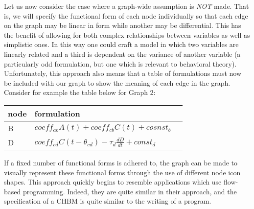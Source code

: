 \documentclass[runningheads,a4paper]{llncs}
\begin{document}
Let us now consider the case where a graph-wide assumption is \emph{NOT} made.
That is, we will specify the functional form of each node individually so that each edge on the graph may be linear in form while another may be differential.
This has the benefit of allowing for both complex relationships between variables as well as simplistic ones.
In this way one could craft a model in which two variables are linearly related and a third is dependent on the variance of another variable (a particularly odd formulation, but one which is relevant to behavioral theory).
Unfortunately, this approach also means that a table of formulations must now be included with our graph to show the meaning of each edge in the graph.
Consider for example the table below for Graph 2:
%
\begin{center}
  \centering
  \begin{tabular}{ | l | l | l |}
      \hline
      node & formulation \\ \hline
      B & $coeff_{ab}A(t) + coeff_{cb}C(t) + cosnst_b$  \\ \hline
      D & $coeff_{cd}C(t-\theta_{cd}) - \tau_{d}\frac{dD}{dt} + const_d$ \\ \hline
  \end{tabular}
\end{center}
%
If a fixed number of functional forms is adhered to, the graph can be made to visually represent these functional forms through the use of different node icon shapes. 
This approach quickly begins to resemble applications which use flow-based programming. 
Indeed, they are quite similar in their approach, and the specification of a CHBM is quite similar to the writing of a program.

\end{document}
